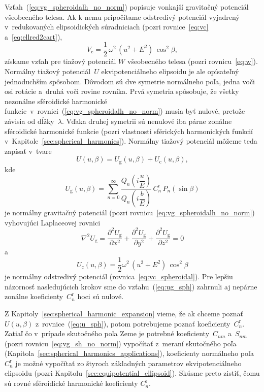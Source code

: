 \documentclass[a4paper,12pt]{book}
\newcommand{\gidx}{\mathrm g}
\newcommand{\cidx}{\mathrm c}
\begin{document}
Vzťah~(\ref{eq:vg_spheroidalh_no_norm}) popisuje vonkajší gravitačný potenciál 
všeobecného telesa.  Ak k nemu pripočítame odstredivý potenciál vyjadrený 
v~redukovaných elipsoidických súradniciach (pozri rovnice~\ref{eq:vc} 
a~\ref{eq:ellred2cart}),
%
\begin{equation}
\label{eq:vc_spheroidal}
V_\cidx = \frac{1}{2} \, \omega^2 \, (u^2 + E^2) \, \cos^2\beta{,}
\end{equation}
%
získame vzťah pre tiažový potenciál $W$ všeobecného telesa (pozri 
rovnicu~\ref{eq:w}).  Normálny tiažový potenciál~$U$ ekvipotenciálneho 
elipsoidu je ale opísateľný jednoduchším spôsobom.  Dôvodom sú dve symetrie 
normálneho poľa, jedna voči osi rotácie a~druhá voči rovine rovníka.  Prvá 
symetria spôsobuje, že všetky nezonálne sféroidické harmonické 
funkcie~v~rovnici~(\ref{eq:vg_spheroidalh_no_norm}) musia byť nulové, pretože 
závisia od dĺžky~$\lambda$.  Vďaka druhej symetrii sú nenulové iba párne 
zonálne sféroidické harmonické funkcie (pozri vlastnosti sférických 
harmonických funkcií v~Kapitole~\ref{sec:spherical_harmonics}).  Normálny 
tiažový potenciál môžeme teda zapísať v~tvare
%
\begin{equation}
\label{eq:u_sph}
U(u, \beta) = U_\gidx(u, \beta) + U_\cidx(u, \beta){,}
\end{equation}
%
kde
%
\begin{equation}
\label{eq:ug_sph}
U_\gidx(u, \beta) = \sum_{n = 0}^\infty \frac{Q_n\left( i \dfrac{u}{E} 
\right)}{Q_n\left( i \dfrac{b}{E} \right)} \,  C^{\mathrm{r}}_n \, 
P_n(\sin\beta)
\end{equation}
%
je normálny gravitačný potenciál (pozri 
rovnicu~\ref{eq:vg_spheroidalh_no_norm}) vyhovujúci Laplaceovej rovnici
%
\begin{equation}
\label{eq:ug_laplace_cart}
\nabla^2 U_\gidx = \frac{\partial^2 U_\gidx}{\partial x^2} + \frac{\partial^2 
U_\gidx}{\partial y^2} + \frac{\partial^2 U_\gidx}{\partial z^2} = 0
\end{equation}
%
a
%
\begin{equation}
\label{eq:uc_sph}
U_\cidx(u, \beta) = \frac{1}{2} \omega^2 \, (u^2 + E^2) \, \cos^2\beta
\end{equation}
%
je normálny odstredivý potenciál (rovnica~\ref{eq:vc_spheroidal}).  Pre lepšiu 
názornosť nasledujúcich krokov sme do vzťahu~(\ref{eq:ug_sph}) zahrnuli aj 
nepárne zonálne koeficienty~$C^{\mathrm{r}}_n$ hoci sú nulové.

Z Kapitoly~\ref{sec:spherical_harmonic_expansion} vieme, že ak chceme poznať 
$U(u,\beta)$ z~rovnice~(\ref{eq:u_sph}), potom potrebujeme poznať 
koeficienty~$C_n^\mathrm{r}$.  Zatiaľ čo v~prípade skutočného poľa Zeme je 
potrebné koeficienty~$C_{nm}$ a~$S_{nm}$ (pozri rovnicu~\ref{eq:vg_sh_no_norm}) 
vypočítať z~meraní skutočného poľa 
(Kapitola~\ref{sec:spherical_harmonics_applications}), koeficienty normálneho 
poľa $C_n^\mathrm{r}$ je možné vypočítať zo štyroch základných parametrov 
ekvipotenciálneho elipsoidu (pozri Kapitolu~\ref{sec:equipotential_ellipsoid}).  
Skúsme preto zistiť, čomu sú rovné sféroidické harmonické koeficienty 
$C_n^\mathrm{r}$.
\end{document}
